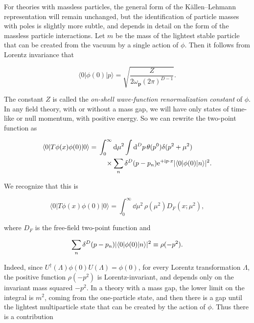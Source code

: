For theories with massless particles, the general form of the Källen--Lehmann \cite{banks-ref-14,banks-ref-15}
representation will remain unchanged, but the identification of particle masses with
poles is slightly more subtle, and depends in detail on the form of the massless particle
interactions. Let $m$ be the mass of the lightest stable particle that can be created from
the vacuum by a single action of $\phi$. Then it follows from Lorentz invariance that

\begin{equation}
\langle0|\phi(0)|p\rangle=\sqrt{\frac{Z}{2\omega_{\mathbf p}(2\pi)^{D-1}}}.
\label{eq:3.40}
\end{equation}

The constant $Z$ is called the \emph{on-shell wave-function renormalization constant} of $\phi$.
In any field theory, with or without a mass gap, we will have only states of time-like
or null momentum, with positive energy. So we can rewrite the two-point function as

\begin{equation}
\begin{split}
\langle0|T\phi(x)\phi(0)|0\rangle
={}&\int_0^\infty\mathop{}\!\mathrm{d}\mu^2\int\mathop{}\!\mathrm{d}^D p\,\theta(p^0)\delta(p^2+\mu^2)\\
&\quad\times\sum_n\delta^D(p-p_n)\mathrm{e}^{+\mathrm{i} p\mathbin{\cdot}x}\lvert\langle0|\phi(0)|n\rangle\rvert^2.
\end{split}
\label{eq:3.41}
\end{equation}

We recognize that this is

\begin{equation}
\langle0|T\phi(x)\phi(0)|0\rangle=\int_0^\infty\dd\mu^2\,\rho(\mu^2)D_F(x;\mu^2),
\label{eq:3.42}
\end{equation}

where $D_F$ is the free-field two-point function and

\begin{equation}
\sum_n\delta^D(p-p_n)\lvert\langle0|\phi(0)|n\rangle\rvert^2\equiv\rho(-p^2).
\label{eq:3.43}
\end{equation}

Indeed, since $U^\dagger(\Lambda)\phi(0)U(\Lambda)=\phi(0)$, for every Lorentz transformation
$\Lambda$, the positive function $\rho(-p^2)$ is Lorentz-invariant, and depends only on the
invariant mass squared $-p^2$.
In a theory with a mass gap, the lower limit on the integral is $m^2$, coming from the
one-particle state, and then there is a gap until the lightest multiparticle state that can
be created by the action of $\phi$. Thus there is a contribution

